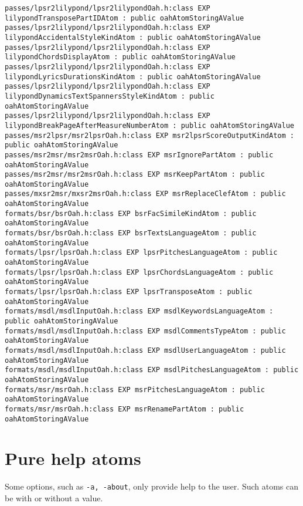 \begin{lstlisting}[language=Terminal]
passes/lpsr2lilypond/lpsr2lilypondOah.h:class EXP lilypondTransposePartIDAtom : public oahAtomStoringAValue
passes/lpsr2lilypond/lpsr2lilypondOah.h:class EXP lilypondAccidentalStyleKindAtom : public oahAtomStoringAValue
passes/lpsr2lilypond/lpsr2lilypondOah.h:class EXP lilypondChordsDisplayAtom : public oahAtomStoringAValue
passes/lpsr2lilypond/lpsr2lilypondOah.h:class EXP lilypondLyricsDurationsKindAtom : public oahAtomStoringAValue
passes/lpsr2lilypond/lpsr2lilypondOah.h:class EXP lilypondDynamicsTextSpannersStyleKindAtom : public oahAtomStoringAValue
passes/lpsr2lilypond/lpsr2lilypondOah.h:class EXP lilypondBreakPageAfterMeasureNumberAtom : public oahAtomStoringAValue
passes/msr2lpsr/msr2lpsrOah.h:class EXP msr2lpsrScoreOutputKindAtom : public oahAtomStoringAValue
passes/msr2msr/msr2msrOah.h:class EXP msrIgnorePartAtom : public oahAtomStoringAValue
passes/msr2msr/msr2msrOah.h:class EXP msrKeepPartAtom : public oahAtomStoringAValue
passes/mxsr2msr/mxsr2msrOah.h:class EXP msrReplaceClefAtom : public oahAtomStoringAValue
formats/bsr/bsrOah.h:class EXP bsrFacSimileKindAtom : public oahAtomStoringAValue
formats/bsr/bsrOah.h:class EXP bsrTextsLanguageAtom : public oahAtomStoringAValue
formats/lpsr/lpsrOah.h:class EXP lpsrPitchesLanguageAtom : public oahAtomStoringAValue
formats/lpsr/lpsrOah.h:class EXP lpsrChordsLanguageAtom : public oahAtomStoringAValue
formats/lpsr/lpsrOah.h:class EXP lpsrTransposeAtom : public oahAtomStoringAValue
formats/msdl/msdlInputOah.h:class EXP msdlKeywordsLanguageAtom : public oahAtomStoringAValue
formats/msdl/msdlInputOah.h:class EXP msdlCommentsTypeAtom : public oahAtomStoringAValue
formats/msdl/msdlInputOah.h:class EXP msdlUserLanguageAtom : public oahAtomStoringAValue
formats/msdl/msdlInputOah.h:class EXP msdlPitchesLanguageAtom : public oahAtomStoringAValue
formats/msr/msrOah.h:class EXP msrPitchesLanguageAtom : public oahAtomStoringAValue
formats/msr/msrOah.h:class EXP msrRenamePartAtom : public oahAtomStoringAValue
\end{lstlisting}


\section{Pure help atoms}

Some options, such as {\tt -a, -about}, only provide help to the user. Such  atoms can be with or without a value.


